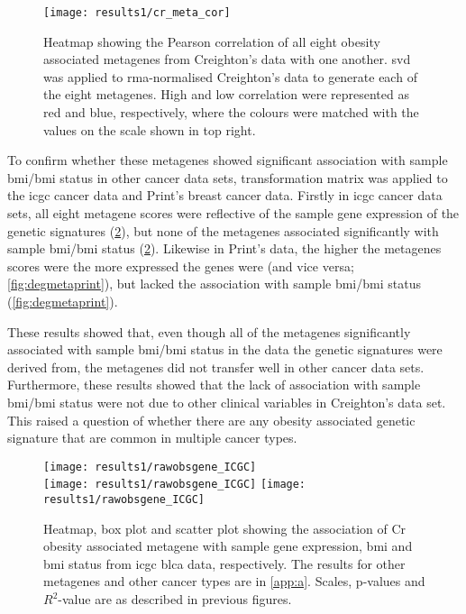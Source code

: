 \begin{figure}[htpb]
	\centering
	\texttt{[image: results1/cr\_meta\_cor]}
	\caption[Pearson correlation of all eight obesity associated metagenes identified in Creighton's data]{Heatmap showing the Pearson correlation of all eight obesity associated metagenes from Creighton's data with one another.
	\gls{svd} was applied to \gls{rma}-normalised Creighton's data to generate each of the eight metagenes.
	High and low correlation were represented as red and blue, respectively, where the colours were matched with the values on the scale shown in top right.}
	\label{fig:cr_meta_cor}
\end{figure}

To confirm whether these metagenes showed significant association with sample \gls{bmi}/\gls{bmi} status in other cancer data sets, transformation matrix was applied to the \gls{icgc} cancer data and Print's breast cancer data.
Firstly in \gls{icgc} cancer data sets, all eight metagene scores were reflective of the sample gene expression of the genetic signatures (\cref{fig:degmetaicgc}), but none of the metagenes associated significantly with sample \gls{bmi}/\gls{bmi} status (\cref{fig:degmetaicgc}).
Likewise in Print's data, the higher the metagenes scores were the more expressed the genes were (and vice versa; \cref{fig:degmetaprint}), but lacked the association with sample \gls{bmi}/\gls{bmi} status (\cref{fig:degmetaprint}).

These results showed that, even though all of the metagenes significantly associated with sample \gls{bmi}/\gls{bmi} status in the data the genetic signatures were derived from, the metagenes did not transfer well in other cancer data sets.
Furthermore, these results showed that the lack of association with sample \gls{bmi}/\gls{bmi} status were not due to other clinical variables in Creighton's data set.
This raised a question of whether there are any obesity associated genetic signature that are common in multiple cancer types.


\begin{figure}[htp!]
	\centering
	\texttt{[image: results1/rawobsgene\_ICGC]}\\
	\vspace{1em}
	\texttt{[image: results1/rawobsgene\_ICGC]}
	\hfill
	\texttt{[image: results1/rawobsgene\_ICGC]}
	\caption[Cr obesity associated metagene in \acrshort{icgc} \acrshort{blca} data]{Heatmap, box plot and scatter plot showing the association of Cr obesity associated metagene with sample gene expression, \gls{bmi} and \gls{bmi} status from \acrshort{icgc} \acrshort{blca} data, respectively.
	The results for other metagenes and other cancer types are in \cref{app:a}.
	Scales, p-values and $R^2$-value are as described in previous figures.}
	\label{fig:degmetaicgc}
\end{figure}

